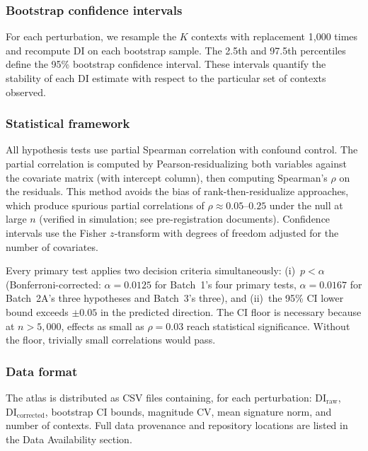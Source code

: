 \documentclass[11pt]{article}
\begin{document}
\subsubsection*{Bootstrap confidence intervals}

For each perturbation, we resample the $K$ contexts with replacement
1{,}000 times and recompute DI on each bootstrap sample.  The 2.5th and
97.5th percentiles define the 95\% bootstrap confidence interval.  These
intervals quantify the stability of each DI estimate with respect to the
particular set of contexts observed.

\subsubsection*{Statistical framework}

All hypothesis tests use partial Spearman correlation with confound
control.  The partial correlation is computed by Pearson-residualizing
both variables against the covariate matrix (with intercept column),
then computing Spearman's $\rho$ on the residuals.  This method avoids
the bias of rank-then-residualize approaches, which produce spurious
partial correlations of $\rho \approx 0.05$--$0.25$ under the null at
large $n$ (verified in simulation; see pre-registration documents).
Confidence intervals use the Fisher $z$-transform with degrees of
freedom adjusted for the number of covariates.

Every primary test applies two decision criteria simultaneously:
(i)~$p < \alpha$ (Bonferroni-corrected: $\alpha = 0.0125$ for Batch~1's
four primary tests, $\alpha = 0.0167$ for Batch~2A's three hypotheses
and Batch~3's three), and (ii)~the 95\% CI lower bound
exceeds $\pm 0.05$ in the predicted direction.  The CI floor is
necessary because at $n > 5{,}000$, effects as small as
$\rho = 0.03$ reach statistical significance.  Without the floor,
trivially small correlations would pass.

\subsubsection*{Data format}

The atlas is distributed as CSV files containing, for each perturbation:
$\mathrm{DI}_{\mathrm{raw}}$, $\mathrm{DI}_{\mathrm{corrected}}$,
bootstrap CI bounds, magnitude CV, mean signature norm, and number of
contexts.  Full data provenance and repository locations are listed in
the Data Availability section.
\end{document}
